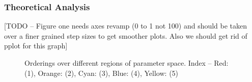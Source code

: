\documentclass[10pt, preprint]{aastex}
\begin{document}
\subsubsection{Theoretical Analysis}
[TODO -- Figure one needs axes revamp (0 to 1 not 100) and should be taken over a finer grained step sizes to get smoother plots.  Also we should get rid of pplot for this graph]
\begin{figure}
	\centering
	\qquad
	\qquad
	\qquad
	\caption{Orderings over different regions of parameter space. Index -- Red: (1), Orange: (2), Cyan: (3), Blue: (4), Yellow: (5)}
\end{figure}
\end{document}
